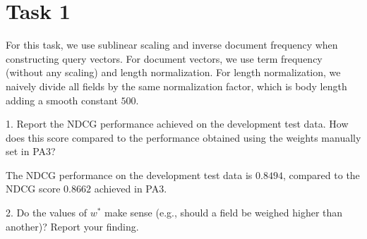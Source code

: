 
\usepackage{graphicx,amssymb,amsmath,enumerate}
\usepackage{courier}
\usepackage{color}
\usepackage{listings}
\usepackage{fancyvrb}
\usepackage{stmaryrd}

\oddsidemargin 0in
\evensidemargin 0in
\textwidth 6.5in
\topmargin -0.5in
\textheight 9.0in




\pagestyle{myheadings}  %

\section{Task 1}
For this task, we use sublinear scaling and inverse document frequency when constructing query vectors.
For document vectors, we use term frequency (without any scaling) and length normalization.
For length normalization, we naively divide all fields by the same normalization factor, which is
body length adding a smooth constant $500$.

1. Report the NDCG performance achieved on the development test data. How does this score compared to the performance obtained using the weights manually set in PA3?

The NDCG performance on the development test data is $0.8494$, compared to the NDCG score $0.8662$ achieved in PA3.

2. Do the values of $w^*$ make sense (e.g., should a field be weighed higher than another)? Report your finding.

